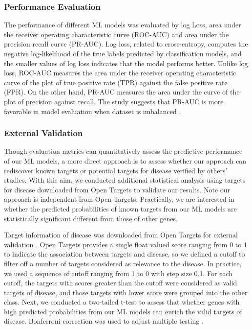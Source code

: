     \subsubsection{Performance Evaluation}
      The performance of different ML models was evaluated by log Loss, area under the receiver operating characteristic curve (ROC-AUC) and area under the precision recall curve (PR-AUC). Log loss, related to cross-entropy, computes the negative log-likelihood of the true labels predicted by classification models, and the smaller values of log loss indicates that the model performs better. Unlike log loss, ROC-AUC measures the area under the receiver operating characteristic curve of the plot of true positive rate (TPR) against the false positive rate (FPR). On the other hand, PR-AUC measures the area under the curve of the plot of precision against recall. The study suggests that PR-AUC is more favorable in model evaluation when dataset is imbalanced \cite{davis2006relationship}.
  
    \subsubsection{External Validation}
      Though evaluation metrics can quantitatively assess the predictive performance of our ML models, a more direct approach is to assess whether our approach can rediscover known targets or potential targets for disease verified by others' studies. With this aim, we conducted additional statistical analysis using targets for disease downloaded from Open Targets \cite{koscielny2017open} to validate our results. Note our approach is independent from Open Targets. Practically, we are interested in whether the predicted probabilities of known targets from our ML models are statistically significant different from those of other genes.

      Target information of disease was downloaded from Open Targets for external validation \cite{koscielny2017open}. Open Targets provides a single float valued score ranging from 0 to 1 to indicate the association between targets and disease, so we defined a cutoff to filter off a number of targets considered as relevance to the disease. In practice, we used a sequence of cutoff ranging from 1 to 0 with step size 0.1. For each cutoff, the targets with scores greater than the cutoff were considered as valid targets of disease, and those targets with lower score were grouped into the other class. Next, we conducted a two-tailed t-test to assess that whether genes with high predicted probabilities from our ML models can enrich the valid targets of disease. Bonferroni correction was used to adjust multiple testing \cite{benjamini1995controlling}.
  

